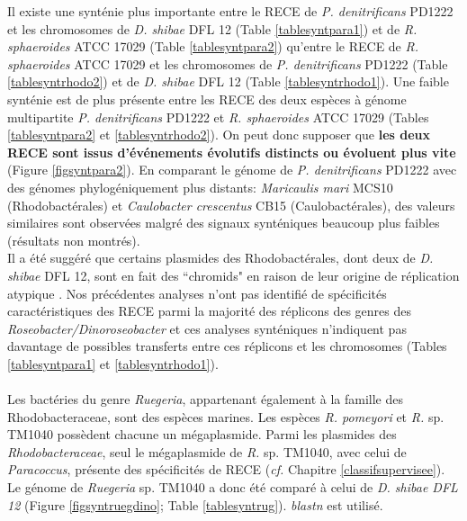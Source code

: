 	Il existe une synténie plus importante entre le RECE de \textit{P. denitrificans} PD1222 et les chromosomes de \textit{D. shibae} DFL 12 (Table \ref{tablesyntpara1}) et de \textit{R. sphaeroides} ATCC 17029 (Table \ref{tablesyntpara2}) qu'entre le RECE de \textit{R. sphaeroides} ATCC 17029 et les chromosomes de \textit{P. denitrificans} PD1222 (Table \ref{tablesyntrhodo2}) et de \textit{D. shibae} DFL 12 (Table \ref{tablesyntrhodo1}). Une faible synténie est de plus présente entre les RECE des deux espèces à génome multipartite \textit{P. denitrificans} PD1222 et \textit{R. sphaeroides} ATCC 17029 (Tables \ref{tablesyntpara2} et \ref{tablesyntrhodo2}). On peut donc supposer que \textbf{les deux RECE sont issus d'événements évolutifs distincts ou évoluent plus vite} (Figure \ref{figsyntpara2}). En comparant le génome de \textit{P. denitrificans} PD1222 avec des génomes phylogéniquement plus distants: \textit{Maricaulis mari} MCS10 (Rhodobactérales) et \textit{Caulobacter crescentus}  CB15 (Caulobactérales), des valeurs similaires sont observées malgré des signaux synténiques beaucoup plus faibles (résultats non montrés).\\
	Il a été suggéré que certains plasmides des Rhodobactérales, dont deux de \textit{D. shibae} DFL 12, sont en fait des ``chromids" en raison de leur origine de réplication atypique \citep{Petersen2013}. Nos précédentes analyses n'ont pas identifié de spécificités caractéristiques des RECE parmi la majorité des réplicons des genres des \textit{Roseobacter/Dinoroseobacter} et ces analyses synténiques n'indiquent pas davantage de possibles transferts entre ces réplicons et les chromosomes (Tables \ref{tablesyntpara1} et \ref{tablesyntrhodo1}).
\\ \\
	 Les bactéries du genre \textit{Ruegeria}, appartenant également à la famille des Rhodobacteraceae, sont des espèces marines. Les espèces \textit{R. pomeyori} et \textit{R.} sp. TM1040 possèdent chacune un mégaplasmide. Parmi les plasmides des \textit{Rhodobacteraceae}, seul le mégaplasmide de \textit{R.} sp. TM1040, avec celui de \textit{Paracoccus}, présente des spécificités de RECE (\textit{cf.} Chapitre \ref{classifsupervisee}). Le génome de \textit{Ruegeria} sp. TM1040 a donc été comparé à celui de \textit{D. shibae DFL 12} (Figure \ref{figsyntruegdino}; Table \ref{tablesyntrug}). \textit{blastn} est utilisé.

